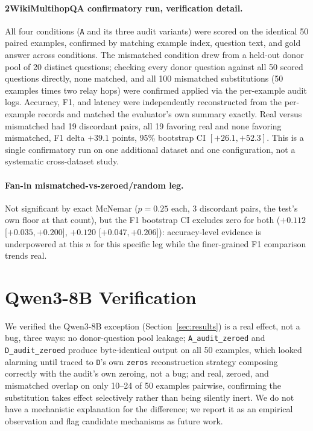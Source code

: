 \documentclass[11pt]{article}
\begin{document}
\paragraph{2WikiMultihopQA confirmatory run, verification detail.}
\label{app:2wiki}
All four conditions (\texttt{A} and its three audit variants) were
scored on the identical 50 paired examples, confirmed by matching
example index, question text, and gold answer across conditions. The
mismatched condition drew from a held-out donor pool of 20 distinct
questions; checking every donor question against all 50 scored
questions directly, none matched, and all 100 mismatched substitutions
(50 examples times two relay hops) were confirmed applied via the
per-example audit logs. Accuracy, F1, and latency were independently
reconstructed from the per-example records and matched the evaluator's
own summary exactly. Real versus mismatched had 19 discordant pairs,
all 19 favoring real and none favoring mismatched, F1 delta $+39.1$
points, 95\% bootstrap CI $[+26.1, +52.3]$. This is a single
confirmatory run on one additional dataset and one configuration, not a
systematic cross-dataset study.

\paragraph{Fan-in mismatched-vs-zeroed/random leg.} Not significant by
exact McNemar ($p=0.25$ each, 3 discordant pairs, the test's own floor
at that count), but the F1 bootstrap CI excludes zero for both
($+0.112$ [$+0.035,+0.200$], $+0.120$ [$+0.047,+0.206$]):
accuracy-level evidence is underpowered at this $n$ for this specific
leg while the finer-grained F1 comparison trends real.

\section{Qwen3-8B Verification}
\label{app:qwen3}

We verified the Qwen3-8B exception (Section~\ref{sec:results}) is a
real effect, not a bug, three ways: no donor-question pool leakage;
\texttt{A\_audit\_zeroed} and \texttt{D\_audit\_zeroed} produce
byte-identical output on all 50 examples, which looked alarming until
traced to \texttt{D}'s own \texttt{zeros} reconstruction strategy
composing correctly with the audit's own zeroing, not a bug; and real,
zeroed, and mismatched overlap on only 10--24 of 50 examples pairwise,
confirming the substitution takes effect selectively rather than being
silently inert. We do not have a mechanistic explanation for the
difference; we report it as an empirical observation and flag candidate
mechanisms as future work.
\end{document}

